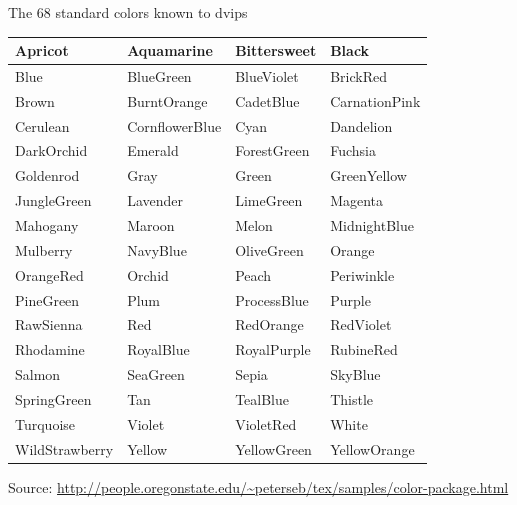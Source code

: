 The 68 standard colors known to dvips\vspace{0.5ex}
\begin{center}\begin{tabular}{|l|l|l|l|}
\hline
{\color{Apricot} Apricot}&
{\color{Aquamarine} Aquamarine}&
{\color{Bittersweet} Bittersweet}&
{\color{Black} Black}\\ \hline
{\color{Blue} Blue}&
{\color{BlueGreen} BlueGreen}&
{\color{BlueViolet} BlueViolet}&
{\color{BrickRed} BrickRed}\\ \hline
{\color{Brown} Brown}&
{\color{BurntOrange} BurntOrange}&
{\color{CadetBlue} CadetBlue}&
{\color{CarnationPink} CarnationPink}\\ \hline
{\color{Cerulean} Cerulean}&
{\color{CornflowerBlue} CornflowerBlue}&
{\color{Cyan} Cyan}&
{\color{Dandelion} Dandelion}\\ \hline
{\color{DarkOrchid} DarkOrchid}&
{\color{Emerald} Emerald}&
{\color{ForestGreen} ForestGreen}&
{\color{Fuchsia} Fuchsia}\\ \hline
{\color{Goldenrod} Goldenrod}&
{\color{Gray} Gray}&
{\color{Green} Green}&
{\color{GreenYellow} GreenYellow}\\ \hline
{\color{JungleGreen} JungleGreen}&
{\color{Lavender} Lavender}&
{\color{LimeGreen} LimeGreen}&
{\color{Magenta} Magenta}\\ \hline
{\color{Mahogany} Mahogany}&
{\color{Maroon} Maroon}&
{\color{Melon} Melon}&
{\color{MidnightBlue} MidnightBlue}\\ \hline
{\color{Mulberry} Mulberry}&
{\color{NavyBlue} NavyBlue}&
{\color{OliveGreen} OliveGreen}&
{\color{Orange} Orange}\\ \hline
{\color{OrangeRed} OrangeRed}&
{\color{Orchid} Orchid}&
{\color{Peach} Peach}&
{\color{Periwinkle} Periwinkle}\\ \hline
{\color{PineGreen} PineGreen}&
{\color{Plum} Plum}&
{\color{ProcessBlue} ProcessBlue}&
{\color{Purple} Purple}\\ \hline
{\color{RawSienna} RawSienna}&
{\color{Red} Red}&
{\color{RedOrange} RedOrange}&
{\color{RedViolet} RedViolet}\\ \hline
{\color{Rhodamine} Rhodamine}&
{\color{RoyalBlue} RoyalBlue}&
{\color{RoyalPurple} RoyalPurple}&
{\color{RubineRed} RubineRed}\\ \hline
{\color{Salmon} Salmon}&
{\color{SeaGreen} SeaGreen}&
{\color{Sepia} Sepia}&
{\color{SkyBlue} SkyBlue}\\ \hline
{\color{SpringGreen} SpringGreen}&
{\color{Tan} Tan}&
{\color{TealBlue} TealBlue}&
{\color{Thistle} Thistle}\\ \hline
{\color{Turquoise} Turquoise}&
{\color{Violet} Violet}&
{\color{VioletRed} VioletRed}&
{\color{White} White}\\ \hline
{\color{WildStrawberry} WildStrawberry}&
{\color{Yellow} Yellow}&
{\color{YellowGreen} YellowGreen}&
{\color{YellowOrange} YellowOrange}\\ \hline
\end{tabular}
\end{center}
Source: \url{http://people.oregonstate.edu/~peterseb/tex/samples/color-package.html}